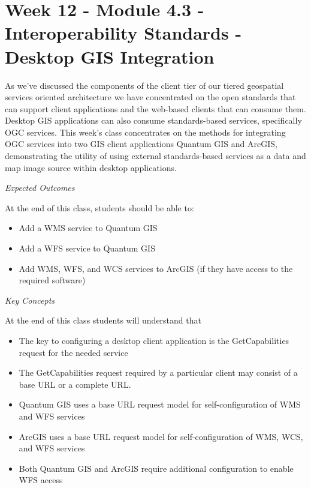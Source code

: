 \documentclass[]{book}
\providecommand{\tightlist}{%
  \setlength{\itemsep}{0pt}\setlength{\parskip}{0pt}}
\begin{document}
\chapter{Week 12 - Module 4.3 - Interoperability Standards - Desktop GIS
Integration}\label{week12}

As we've discussed the components of the client tier of our tiered
geospatial services oriented architecture we have concentrated on the
open standards that can support client applications and the web-based
clients that can consume them. Desktop GIS applications can also consume
standards-based services, specifically OGC services. This week's class
concentrates on the methods for integrating OGC services into two GIS
client applications Quantum GIS and ArcGIS, demonstrating the utility of
using external standards-based services as a data and map image source
within desktop applications.

\emph{Expected Outcomes}

At the end of this class, students should be able to:

\begin{itemize}
\tightlist
\item
  Add a WMS service to Quantum GIS
\item
  Add a WFS service to Quantum GIS
\item
  Add WMS, WFS, and WCS services to ArcGIS (if they have access to the
  required software)
\end{itemize}

\emph{Key Concepts}

At the end of this class students will understand that

\begin{itemize}
\tightlist
\item
  The key to configuring a desktop client application is the
  GetCapabilities request for the needed service
\item
  The GetCapabilities request required by a particular client may
  consist of a base URL or a complete URL.
\item
  Quantum GIS uses a base URL request model for self-configuration of
  WMS and WFS services
\item
  ArcGIS uses a base URL request model for self-configuration of WMS,
  WCS, and WFS services
\item
  Both Quantum GIS and ArcGIS require additional configuration to enable
  WFS access
\end{itemize}
\end{document}
